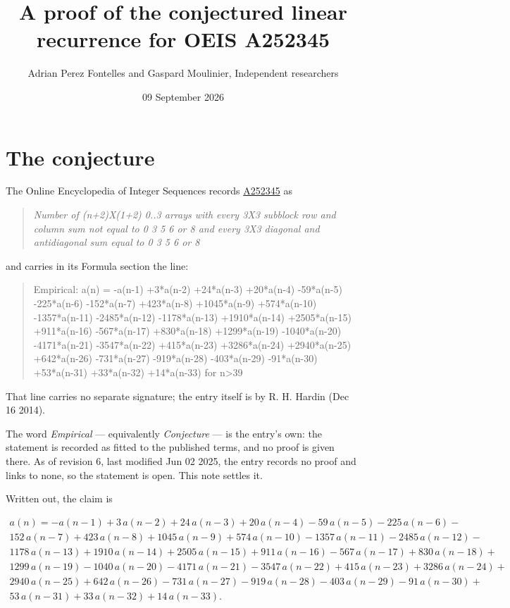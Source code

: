 \documentclass[11pt]{article}
\title{A proof of the conjectured linear recurrence for OEIS A252345}
\author{Adrian Perez Fontelles and Gaspard Moulinier, Independent researchers}
\date{09 September 2026}
\theoremstyle{definition}
\begin{document}
\maketitle
\section{The conjecture}

The Online Encyclopedia of Integer Sequences records \href{https://oeis.org/A252345}{A252345} as

\begin{quote}\itshape Number of (n+2)X(1+2) 0..3 arrays with every 3X3 subblock row and column sum not equal to 0 3 5 6 or 8 and every 3X3 diagonal and antidiagonal sum equal to 0 3 5 6 or 8\end{quote}

and carries in its Formula section the line:

\begin{quote}\ttfamily Empirical: a(n) = -a(n-1) +3*a(n-2) +24*a(n-3) +20*a(n-4) -59*a(n-5) -225*a(n-6) -152*a(n-7) +423*a(n-8) +1045*a(n-9) +574*a(n-10) -1357*a(n-11) -2485*a(n-12) -1178*a(n-13) +1910*a(n-14) +2505*a(n-15) +911*a(n-16) -567*a(n-17) +830*a(n-18) +1299*a(n-19) -1040*a(n-20) -4171*a(n-21) -3547*a(n-22) +415*a(n-23) +3286*a(n-24) +2940*a(n-25) +642*a(n-26) -731*a(n-27) -919*a(n-28) -403*a(n-29) -91*a(n-30) +53*a(n-31) +33*a(n-32) +14*a(n-33) for n>39\end{quote}

That line carries no separate signature; the entry itself is by R. H. Hardin (Dec 16 2014).

The word {\itshape Empirical} --- equivalently {\itshape Conjecture} --- is the entry's own: the statement is recorded as fitted to the published terms, and no proof is given there. As of revision 6, last modified Jun 02 2025, the entry records no proof and links to none, so the statement is open. This note settles it.

Written out, the claim is

\begin{multline*} a(n) = -a(n-1) + 3\,a(n-2) + 24\,a(n-3) + 20\,a(n-4) - 59\,a(n-5) - 225\,a(n-6) - \\ 152\,a(n-7) + 423\,a(n-8) + 1045\,a(n-9) + 574\,a(n-10) - 1357\,a(n-11) - 2485\,a(n-12) - \\ 1178\,a(n-13) + 1910\,a(n-14) + 2505\,a(n-15) + 911\,a(n-16) - 567\,a(n-17) + 830\,a(n-18) + \\ 1299\,a(n-19) - 1040\,a(n-20) - 4171\,a(n-21) - 3547\,a(n-22) + 415\,a(n-23) + 3286\,a(n-24) + \\ 2940\,a(n-25) + 642\,a(n-26) - 731\,a(n-27) - 919\,a(n-28) - 403\,a(n-29) - 91\,a(n-30) + \\ 53\,a(n-31) + 33\,a(n-32) + 14\,a(n-33). \end{multline*}
\end{document}
